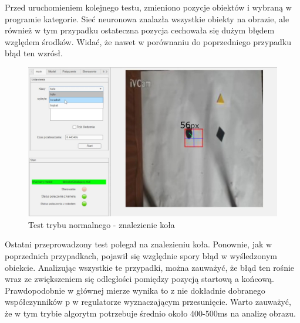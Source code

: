 Przed uruchomieniem kolejnego testu, zmieniono pozycje obiektów i wybraną w programie kategorie. 
Sieć neuronowa znalazła wszystkie obiekty na obrazie, ale również w tym przypadku ostateczna pozycja cechowała się 
dużym błędem względem środków. Widać, że nawet w porównaniu do poprzedniego przypadku błąd ten wzrósł.
\begin{figure}[H]
	\centering
	\includegraphics[width=14cm]{pages/testy/img/test1_3.jpg}
	\caption{Test trybu normalnego - znalezienie koła}
\end{figure}
Ostatni przeprowadzony test polegał na znalezieniu koła. Ponownie, jak w poprzednich przypadkach, pojawił się względnie spory błąd w wyśledzonym obiekcie. 
Analizując wszystkie te przypadki, można zauważyć, że błąd ten rośnie wraz ze zwiększeniem się odległości pomiędzy pozycją startową a końcową.
Prawdopodobnie w głównej mierze wynika to z nie dokładnie dobranego współczynników p w regulatorze wyznaczającym przesunięcie.
Warto zauważyć, że w tym trybie algorytm potrzebuje średnio około 400-500ms na analizę obrazu.
